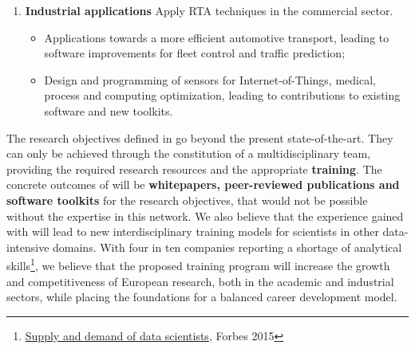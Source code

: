 \begin{enumerate}
\item\textbf{Industrial applications} Apply RTA techniques in the commercial sector.
\begin{itemize}
\item Applications towards a more efficient automotive transport, leading to software improvements for fleet control and traffic prediction;
\item Design and programming of sensors for Internet-of-Things, medical, process and computing optimization, leading to contributions to existing software and new toolkits. 
\end{itemize}

\end{enumerate} 


The research objectives defined in \acronym go beyond the present state-of-the-art. 
They can only be achieved through the constitution 
of a multidisciplinary team, 
providing
the required research resources and the appropriate \textbf{training}. 
The concrete outcomes of \acronym will be \textbf{whitepapers, peer-reviewed publications and 
software toolkits} for the research objectives, that would not be possible without the expertise in this network. 
We also believe that the experience gained
with \acronym will lead to new interdisciplinary training models for scientists
in other data-intensive domains. With four in ten companies reporting a shortage of analytical skills\footnote{\href{http://www.forbes.com/sites/gilpress/2015/04/30/the-supply-and-demand-of-data-scientists-what-the-surveys-say/}{Supply and demand of data scientists}, Forbes 2015},
we believe that the proposed training program will increase the growth and competitiveness of 
European research, both in the academic and industrial sectors, while placing the foundations for a balanced career 
development model.


